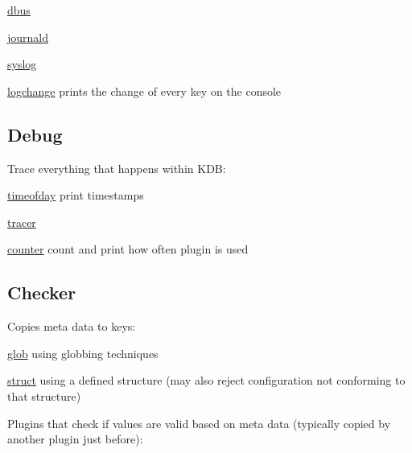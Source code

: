 \begin{DoxyItemize}
\item \hyperlink{md_src_plugins_dbus_README_src_plugins_dbus_README_md}{dbus}
\item \hyperlink{md_src_plugins_journald_README_src_plugins_journald_README_md}{journald}
\item \hyperlink{md_src_plugins_syslog_README_src_plugins_syslog_README_md}{syslog}
\item \hyperlink{md_src_plugins_logchange_README_src_plugins_logchange_README_md}{logchange} prints the change of every key on the console
\end{DoxyItemize}

\subsection*{Debug}

Trace everything that happens within K\+D\+B\+:


\begin{DoxyItemize}
\item \hyperlink{md_src_plugins_timeofday_README_src_plugins_timeofday_README_md}{timeofday} print timestamps
\item \hyperlink{md_src_plugins_tracer_README_src_plugins_tracer_README_md}{tracer}
\item \hyperlink{md_src_plugins_counter_README_src_plugins_counter_README_md}{counter} count and print how often plugin is used
\end{DoxyItemize}

\subsection*{Checker}

Copies meta data to keys\+:


\begin{DoxyItemize}
\item \hyperlink{md_src_plugins_glob_README_src_plugins_glob_README_md}{glob} using globbing techniques
\item \hyperlink{md_src_plugins_struct_README_src_plugins_struct_README_md}{struct} using a defined structure (may also reject configuration not conforming to that structure)
\end{DoxyItemize}

Plugins that check if values are valid based on meta data (typically copied by another plugin just before)\+:


